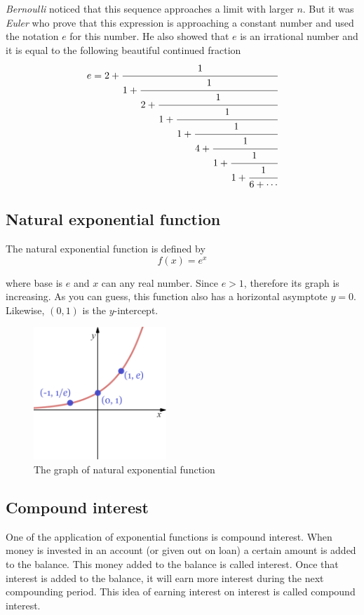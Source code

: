 \textit{Bernoulli} noticed that this sequence approaches a limit with larger $n$. But it was
\textit{Euler} who prove that this expression is approaching a constant number and used the
notation $e$ for this number. He also showed that $e$ is an irrational number and it is equal
to the following beautiful continued fraction 
	\[
		e=2+\cfrac{1}
		  {1+\cfrac{1}
		  {2+\cfrac{1}
		  {1+\cfrac{1}
		  {1+\cfrac{1}
		  {4+\cfrac{1}
		  {1+\cfrac{1}
		  {1+\cfrac{1}
		  {6+\cdots}}}}}}}}
	\]
\subsection{Natural exponential function}	
The natural exponential function is defined by
	\begin{equation}
		f(x)=e^x
		\label{natural}
	\end{equation}

where base is $e$ and $x$ can any real number. Since $e>1$, therefore its graph is increasing.
As you can guess, this function also has a horizontal asymptote $y=0$. Likewise, $(0,1)$ is the
$y$-intercept.  
		\begin{figure}[H]
		 \includegraphics[width=5cm]{pics/natural_func.png}
		 \centering
		 \caption{The graph of natural exponential function}
		 \label{fig:natural_func}
		\end{figure}

\subsection{Compound interest}
One of the application of exponential functions is compound interest. When
money is invested in an account (or given out on loan) a certain amount is added to the
balance. This money added to the balance is called interest. Once that interest is added to the
balance, it will earn more interest during the next compounding period. This idea of earning
interest on interest is called compound interest.

